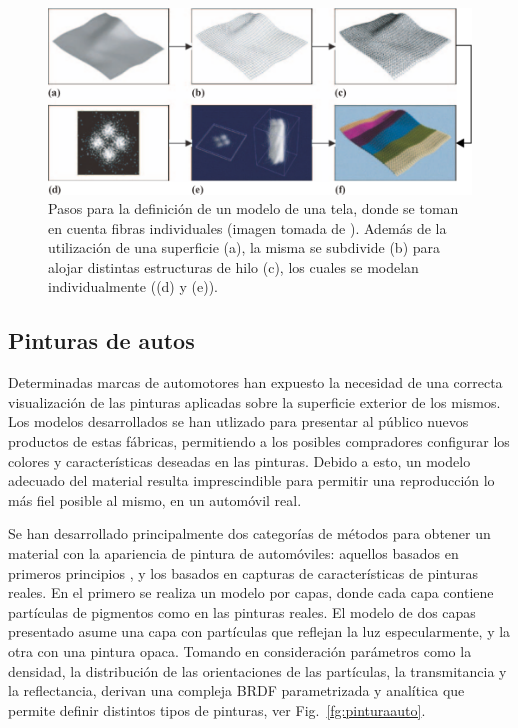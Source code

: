 \begin{figure}
\center
\includegraphics[width=13cm]{figures/tela}
\caption[Pasos para la definición de un modelo de una tela]{Pasos para la definición de un modelo de una tela, donde se toman en cuenta fibras individuales (imagen tomada de \cite{Xu2001}). Además de la utilización de una superficie (a), la misma se subdivide (b) para alojar distintas estructuras de hilo (c), los cuales se modelan individualmente ((d) y (e)).}
\label{fg:tela}
\end{figure}

\subsection{Pinturas de autos}
Determinadas marcas de automotores han expuesto la necesidad de una correcta visualización de las pinturas aplicadas sobre la superficie exterior de los mismos.
Los modelos desarrollados se han utlizado para presentar al público nuevos productos de estas fábricas, permitiendo a los posibles compradores configurar los colores y características deseadas en las pinturas.
Debido a esto, un modelo adecuado del material resulta imprescindible para permitir una reproducción lo más fiel posible al mismo, en un automóvil real.

Se han desarrollado principalmente dos categorías de métodos para obtener un material con la apariencia de pintura de automóviles: aquellos basados en primeros principios \cite{Ershov2001}, y los basados en capturas de características de pinturas reales.
En el primero se realiza un modelo por capas, donde cada capa contiene partículas de pigmentos como en las pinturas reales.
El modelo de dos capas presentado asume una capa con partículas que reflejan la luz especularmente, y la otra con una pintura opaca.
Tomando en consideración parámetros como la densidad, la distribución de las orientaciones de las partículas, la transmitancia y la reflectancia, derivan una compleja BRDF parametrizada y analítica que permite definir distintos tipos de pinturas, ver Fig.~\ref{fg:pinturaauto}.

